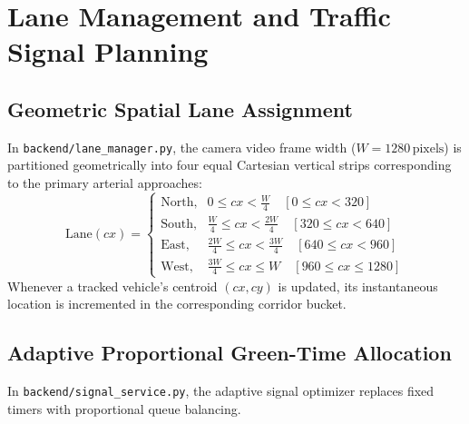 \chapter{Lane Management and Traffic Signal Planning}

\section{Geometric Spatial Lane Assignment}
In \texttt{backend/lane\_manager.py}, the camera video frame width ($W = 1280\,\text{pixels}$) is partitioned geometrically into four equal Cartesian vertical strips corresponding to the primary arterial approaches:
\begin{equation}
\text{Lane}(cx) =
\begin{cases}
\text{North}, & 0 \le cx < \frac{W}{4} \quad [0 \le cx < 320] \\
\text{South}, & \frac{W}{4} \le cx < \frac{2W}{4} \quad [320 \le cx < 640] \\
\text{East}, & \frac{2W}{4} \le cx < \frac{3W}{4} \quad [640 \le cx < 960] \\
\text{West}, & \frac{3W}{4} \le cx \le W \quad [960 \le cx \le 1280]
\end{cases}
\end{equation}
Whenever a tracked vehicle's centroid $(cx, cy)$ is updated, its instantaneous location is incremented in the corresponding corridor bucket.

\section{Adaptive Proportional Green-Time Allocation}
In \texttt{backend/signal\_service.py}, the adaptive signal optimizer replaces fixed timers with proportional queue balancing.


